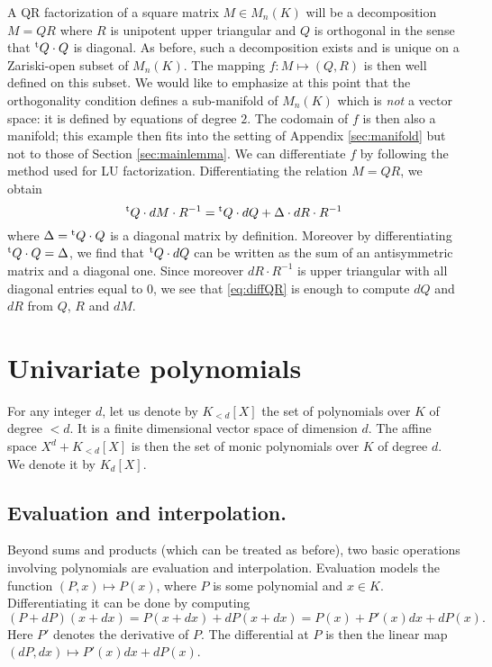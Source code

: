 \documentclass{sig-alternate}
\begin{document}
{A QR factorization of a square matrix $M \in M_n(K)$ will be
a decomposition $M = QR$ where $R$ is unipotent upper triangular and $Q$ is
orthogonal in the sense that ${}^{\text t} Q \cdot Q$ is diagonal. As before, such 
a decomposition exists and is unique on a Zariski-open subset of $M_n(K)$. The
mapping $f : M \mapsto (Q,R)$ is then well defined on this subset. We 
would like to emphasize at this point that the orthogonality condition
defines a sub-manifold of $M_n(K)$ which is \emph{not} a
vector space: it is defined by equations of degree $2$. The codomain
of $f$ is then also a manifold; this example then fits into the setting
of Appendix \ref{sec:manifold} but not to those of Section \ref{sec:mainlemma}. 
We can differentiate $f$ by following the method used for LU 
factorization.  Differentiating the relation $M = QR$, we obtain
\begin{equation}
\label{eq:diffQR}
{}^{\text t} Q \cdot dM \cdot R^{-1} = {}^{\text t} Q \cdot dQ + \Delta \cdot dR 
\cdot R^{-1}
\end{equation}
where $\Delta = {}^{\text t} Q \cdot Q$ is a diagonal matrix by definition.
Moreover by differentiating ${}^{\text t} Q \cdot Q = \Delta$, we find that
${}^{\text t} Q \cdot dQ$ can be written as the sum of an antisymmetric 
matrix and a diagonal one. Since moreover $dR \cdot R^{-1}$ is upper
triangular with all diagonal entries equal to $0$, we see that 
\eqref{eq:diffQR} is enough to compute $dQ$ and $dR$ from $Q$, $R$ 
and $dM$.

\section{Univariate polynomials}
\label{sec:polynomials}

For any integer $d$, let us denote by $K_{< d}[X]$ the set of 
polynomials over $K$ of degree $< d$. It is a finite dimensional vector 
space of dimension $d$. The affine space $X^d + K_{< d}[X]$ is then 
the set of monic polynomials over $K$ of degree $d$. We denote it by 
$K_d[X]$.

\subsection*{Evaluation and interpolation.}

Beyond sums and products (which can be treated as before), two basic 
operations involving polynomials are evaluation and interpolation.
Evaluation models the function $(P,x) \mapsto P(x)$, where
$P$ is some polynomial and $x \in K$. Differentiating
it can be done by computing
\begin{equation}
\label{eq:diffeval}
(P + dP)(x + dx) = P(x + dx) + dP(x + dx) = P(x) + P'(x) dx + dP(x).
\end{equation}
Here $P'$ denotes the derivative of 
$P$. The differential at $P$ is then the linear map $(dP, dx) \mapsto 
P'(x) dx + dP(x)$.

}
\end{document}
